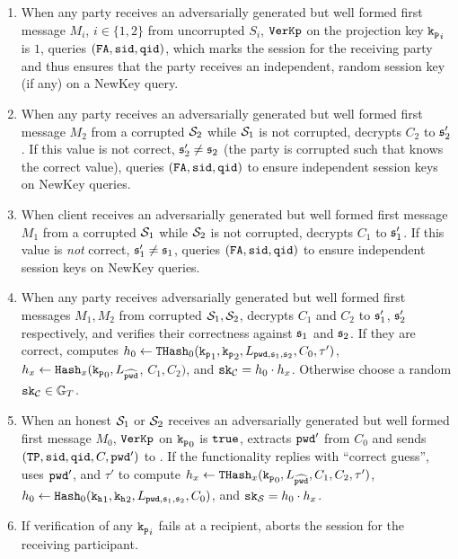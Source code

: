 \begin{enumerate}
  \item When any party receives an adversarially generated but well formed first message $M_i$, $i\in\{1,2\}$ from uncorrupted $S_i$, \ie $\mathtt{VerKp}$ on the projection key $\mathtt{k_p}_i$ is $1$, \SIM queries $(\mathtt{FA}, \mathtt{sid}, \mathtt{qid})$, which marks the session \failed for the receiving party and thus ensures that the party receives an independent, random session key (if any) on a NewKey query.
        
  \item When any party receives an adversarially generated but well formed first message $M_2$ from a corrupted $\mathcal{S}_2$ while $\mathcal{S}_1$ is not corrupted, \SIM decrypts $C_2$ to $\mathfrak{s}'_2$.
        If this value is not correct, $\mathfrak{s}'_2\not=\mathfrak{s}_2$ (the party is corrupted such that \SIM knows the correct value), \SIM queries $(\mathtt{FA}, \mathtt{sid}, \mathtt{qid})$ to ensure independent session keys on NewKey queries.    
        
  \item When client \Client receives an adversarially generated but well formed first message $M_1$ from a corrupted $\mathcal{S}_1$ while $\mathcal{S}_2$ is not corrupted, \SIM decrypts $C_1$ to $\mathfrak{s}'_1$.
        If this value is \emph{not} correct, $\mathfrak{s}'_1\not=\mathfrak{s}_1$, \SIM queries $(\mathtt{FA}, \mathtt{sid}, \mathtt{qid})$ to ensure independent session keys on NewKey queries.    
        
  \item When any party receives adversarially generated but well formed first messages $M_1, M_2$ from corrupted $\mathcal{S}_1, \mathcal{S}_2$, \SIM decrypts $C_1$ and $C_2$ to $\mathfrak{s}'_1$, $\mathfrak{s}'_2$ respectively, and verifies their correctness against $\mathfrak{s}_1$ and $\mathfrak{s}_2$.
        If they are correct, \SIM computes $h_0\gets\mathtt{THash}_0(\mathtt{k_p}_1, \mathtt{k_p}_2,  L_{\mathtt{pwd}, \mathfrak{s}_1, \mathfrak{s}_2}, C_0, \tau')$, $h_x\gets\mathtt{Hash}_x(\mathtt{k_p}_0, L_{\widehat{\mathtt{pwd}}}$, $C_1, C_2)$, and $\mathtt{sk}_\mathcal{C}=h_0\cdot h_x$.
        Otherwise choose a random $\mathtt{sk}_\mathcal{C}\in\mathbb{G}_T$.
         
  \item When an honest $\mathcal{S}_1$ or $\mathcal{S}_2$ receives an adversarially generated but well formed first message $M_0$, \ie $\mathtt{VerKp}$ on $\mathtt{k_p}_0$ is $\mathtt{true}$, \SIM extracts $\mathtt{pwd}'$ from $C_0$ and sends $(\mathtt{TP}, \mathtt{sid}, \mathtt{qid}, C, \mathtt{pwd}')$ to \FTWOPAKE.
        If the functionality replies with ``correct guess'', \SIM uses $\mathtt{pwd}'$, \crs and $\tau'$ to compute $h_x\gets\mathtt{THash}_x(\mathtt{k_p}_0, L_{\widehat{\mathtt{pwd}}}, C_1, C_2, \tau')$, $h_0\gets\mathtt{Hash}_0(\mathtt{k_h}_1, \mathtt{k_h}_2, L_{\mathtt{pwd}, \mathfrak{s}_1, \mathfrak{s}_2}, C_0)$, and $\mathtt{sk}_\mathcal{S}=h_0\cdot h_x$.
        
  \item If verification of any $\mathtt{k_p}_i$ fails at a recipient, \SIM aborts the session for the receiving participant.
\end{enumerate}  

